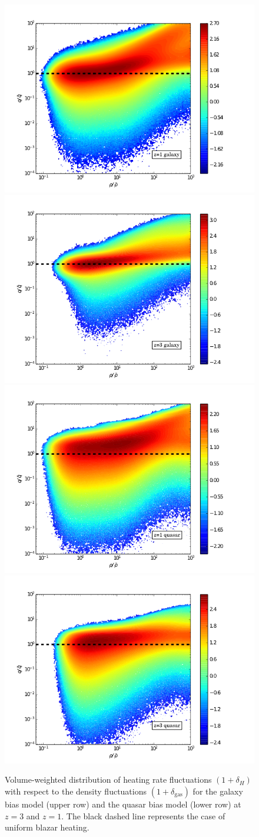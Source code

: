 \documentclass[numberedappendix]{emulateapj}
\begin{document}
\begin{figure}[h]
\centering
\includegraphics[width = .45\textwidth ]{delta_deltah_z1_gal2_ok.png}
\includegraphics[width = .45\textwidth ]{delta_deltah_z3_gal2_ok.png}\\
\includegraphics[width = .45\textwidth ]{delta_deltah_z1_qso4_512b.png}
\includegraphics[width = .45\textwidth ]{delta_deltah_z3_qso4_512b.png}
\caption{Volume-weighted distribution of heating rate fluctuations $(1+\delta_H)$ with respect to the density fluctuations $(1+\delta_{\mathrm{gas}})$ for the galaxy bias model (upper row) and the quasar bias model (lower row) at $z=3$ and $z=1$. The black dashed line represents the case of uniform blazar heating.}
\label{fig:deltas}
\end{figure}
\end{document}
